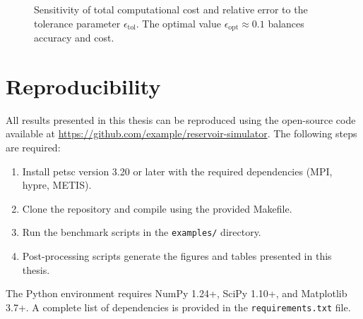 \begin{figure}[htbp]
    \centering
    \caption{Sensitivity of total computational cost and relative error to the tolerance parameter $\epsilon_{\text{tol}}$. The optimal value $\epsilon_{\text{opt}} \approx 0.1$ balances accuracy and cost.}
    \label{fig:sensitivity}
\end{figure}

\chapter{Reproducibility}
\label{app:reproducibility}

All results presented in this thesis can be reproduced using the open-source code available at \url{https://github.com/example/reservoir-simulator}. The following steps are required:

\begin{enumerate}
    \item Install \gls{petsc} version 3.20 or later with the required dependencies (MPI, hypre, METIS).
    \item Clone the repository and compile using the provided Makefile.
    \item Run the benchmark scripts in the \texttt{examples/} directory.
    \item Post-processing scripts generate the figures and tables presented in this thesis.
\end{enumerate}

The Python environment requires NumPy 1.24+, SciPy 1.10+, and Matplotlib 3.7+. A complete list of dependencies is provided in the \texttt{requirements.txt} file.
